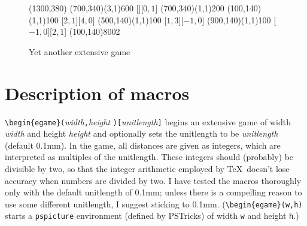 \documentclass[12pt]{article}
\begin{document}
\begin{figure}[htb]
\hspace*{\fill}
\begin{egame}(1300,380)
%
\putbranch(700,340)(3,1){600}
%
[][$0,1$]
%
\initialtrue
\putbranch(700,340)(1,1){200}
%
\egactionlabelsep=0.2mm
%
\egactionlabelsep=0.7mm
\putbranch(100,140)(1,1){100}
%
[$2,1$][$4,0$]
%
\putbranch(500,140)(1,1){100}
%
[$1,3$][$-1,0$]
%
\putbranch(900,140)(1,1){100}
%
[$-1,0$][$2,1$]
%
\infoset(100,140){800}{2}
%
\end{egame}
\hspace*{\fill}
\caption[]{Yet another extensive game}\label{f:four}
\end{figure}


\section{Description of macros\label{s:descr}}
\verb+\begin{egame}(+\emph{width}\verb+,+\emph{height}%
{\tt )[}\emph{unitlength}\verb+]+\newline
\noindent begins an extensive game of width \emph{width} and height
\emph{height} and optionally sets the unitlength to be \emph{unitlength}
(default 0.1mm).  In the game, all distances are given as integers, which are
interpreted as multiples of the unitlength.  These integers should (probably)
be divisible by two, so that the integer arithmetic employed by \TeX\ doesn't
lose accuracy when numbers are divided by two.  I have tested the macros
thoroughly only with the default unitlength of 0.1mm; unless there is a
compelling reason to use some different unitlength, I suggest sticking to
0.1mm.  (\verb+\begin{egame}(w,h)+ starts a \verb+pspicture+ environment
(defined by PSTricks) of width {\tt w} and height {\tt h}.)
\end{document}
